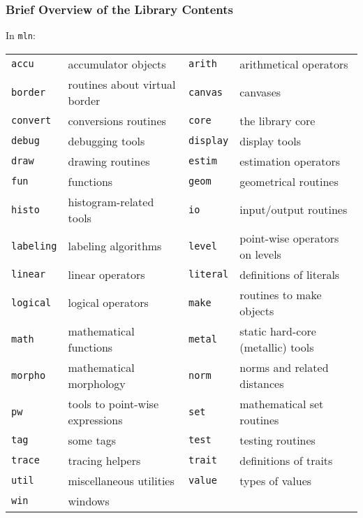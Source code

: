 \documentclass{beamer}
\begin{document}
\begin{frame}
  \frametitle{\mln Brief Overview of the Library Contents}

  In \texttt{mln}:
\smallskip

{\scriptsize
\hspace*{-5mm}
    \begin{tabular}{|ll|ll|}
      \hline
\texttt{accu} & accumulator objects &
\texttt{arith} & arithmetical operators \\
\texttt{border} & routines about virtual border &
\texttt{canvas} & canvases \\
\texttt{convert} & conversions routines &
\texttt{core} & the library core \\
\texttt{debug} & debugging tools &
\texttt{display} & display tools \\
\texttt{draw} & drawing routines &
\texttt{estim} & estimation operators \\
\texttt{fun} & functions &
\texttt{geom} & geometrical routines \\
\texttt{histo} & histogram-related tools &
\texttt{io} & input/output routines \\
\texttt{labeling} & labeling algorithms &
\texttt{level} & point-wise operators on levels \\
\texttt{linear} & linear operators &
\texttt{literal} & definitions of literals \\
\texttt{logical} & logical operators &
\texttt{make} & routines to make objects \\
\texttt{math} & mathematical functions &
\texttt{metal} & static hard-core (metallic) tools \\
\texttt{morpho} & mathematical morphology &
\texttt{norm} & norms and related distances \\
\texttt{pw} & tools to point-wise expressions  &
\texttt{set} & mathematical set routines \\
\texttt{tag} & some tags &
\texttt{test} & testing routines \\
\texttt{trace} & tracing helpers &
\texttt{trait} & definitions of traits \\
\texttt{util} & miscellaneous utilities &
\texttt{value} & types of values \\
\texttt{win} & windows & & \\
      \hline
    \end{tabular}
} %

\end{frame}
\end{document}
